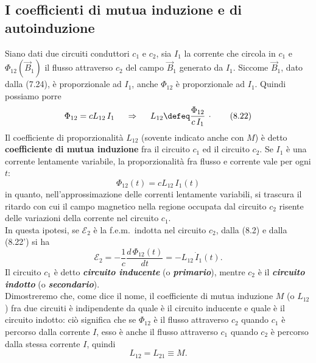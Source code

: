 \subsection{I coefficienti di mutua induzione e di autoinduzione}

Siano dati due circuiti conduttori $c_1$ e $c_2$, sia $I_1$ la corrente che
circola in $c_1$ e $\Phi_{12}(\vec B_1)$ il flusso attraverso $c_2$ del campo
$\vec B_1$ generato da $I_1$. Siccome $\vec B_1$, dato dalla (7.24), \`e
proporzionale ad $I_1$, anche $\Phi_{12}$ \`e proporzionale ad $I_1$. Quindi
possiamo porre
\begin{equation}
  \Phi_{12}=cL_{12}\,I_1
  \quad\ \Rightarrow\quad\ L_{12}\defeq\frac{\Phi_{12}}{c\,I_1}\,\cdot
  \tag{8.22}
\end{equation}
Il coefficiente di proporzionalit\`a $L_{12}$ (sovente indicato anche con $M$)
\`e detto \textbf{coefficiente di mutua induzione} fra il circuito $c_1$ ed il
circuito $c_2$. Se $I_1$ \`e una corrente lentamente variabile, la
proporzionalit\`a fra flusso e corrente vale per ogni $t$:
\begin{equation}
  \Phi_{12}(t)=cL_{12}\,I_1(t)
  \tag{8.22'}
\end{equation}
in quanto, nell'approssimazione delle correnti lentamente variabili, si trascura
il ritardo con cui il campo magnetico nella regione occupata dal circuito $c_2$
risente delle variazioni della corrente nel circuito $c_1$.\\
In questa ipotesi, se $\mathcal E_2$ \`e la f.e.m.\ indotta nel circuito $c_2$,
dalla (8.2) e dalla (8.22') si ha
\begin{equation}
  \mathcal E_2=-\frac{1}{c}\frac{d\,\Phi_{12}(t)}{dt}=-L_{12}\,\dot I_1(t).
  \tag{8.23}
\end{equation}
Il circuito $c_1$ \`e detto \textbf{\textit{circuito inducente}} (o
\textbf{\textit{primario}}), mentre $c_2$ \`e il \textbf{\textit{circuito
indotto}} (o \textbf{\textit{secondario}}).\\
Dimostreremo che, come dice il nome, il coefficiente di mutua induzione $M$ (o
$L_{12}$) fra due circuiti \`e indipendente da quale \`e il circuito inducente e
quale \`e il circuito indotto: ci\`o significa che se $\Phi_{12}$ \`e il flusso
attraverso $c_2$ quando $c_1$ \`e percorso dalla corrente $I$, esso \`e anche il
flusso attraverso $c_1$ quando $c_2$ \`e percorso dalla stessa corrente $I$,
quindi
\begin{equation}
  L_{12}=L_{21}\equiv M.
  \tag{8.24}
\end{equation}
